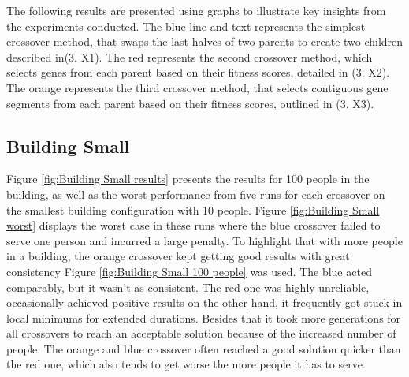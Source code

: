 
The following results are presented using graphs to illustrate key insights from the experiments conducted. The blue line and text represents the simplest crossover method, that swaps the last halves of two parents to create two children described in(3. X1). The red represents the second crossover method, which selects genes from each parent based on their fitness scores, detailed in (3. X2). The orange represents the third crossover method, that selects contiguous gene segments from each parent based on their fitness scores, outlined in (3. X3).

\subsection{Building Small}
Figure \ref{fig:Building Small results} presents the results for 100 people in the building, as well as the worst performance from five runs for each crossover on the smallest building configuration with 10 people. Figure \ref{fig:Building Small worst} displays the worst case in these runs where the blue crossover failed to serve one person and incurred a large penalty. To highlight that with more people in a building, the orange crossover kept getting good results with great consistency Figure \ref{fig:Building Small 100 people} was used. The blue acted comparably, but it wasn't as consistent. The red one was highly unreliable, occasionally achieved positive results on the other hand, it frequently got stuck in local minimums for extended durations. Besides that it took more generations for all crossovers to reach an acceptable solution because of the increased number of people. The orange and blue crossover often reached a good solution quicker than the red one, which also tends to get worse the more people it has to serve.

